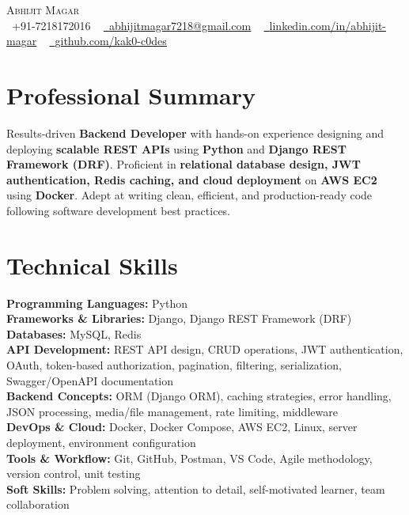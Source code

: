 \documentclass[letterpaper,11pt]{article}
\begin{document}
\begin{center}
    {\Huge \scshape Abhijit Magar} \\ \vspace{4pt}
    \small \faPhone\ +91-7218172016 ~
    \href{mailto:abhijitmagar7218@gmail.com}{\faEnvelope\ \underline{abhijitmagar7218@gmail.com}} ~
    \href{https://www.linkedin.com/in/abhijit-magar}{\faLinkedin\ \underline{linkedin.com/in/abhijit-magar}} ~
    \href{https://github.com/kak0-c0des}{\faGithub\ \underline{github.com/kak0-c0des}}
\end{center}

\section{Professional Summary}
Results-driven \textbf{Backend Developer} with hands-on experience designing and deploying \textbf{scalable REST APIs} using \textbf{Python} and \textbf{Django REST Framework (DRF)}. Proficient in \textbf{relational database design, JWT authentication, Redis caching, and cloud deployment} on \textbf{AWS EC2} using \textbf{Docker}. Adept at writing clean, efficient, and production-ready code following software development best practices.

\section{Technical Skills}
\vspace{2pt}
\textbf{Programming Languages:} Python \\[3pt]
\textbf{Frameworks \& Libraries:} Django, Django REST Framework (DRF) \\[3pt]
\textbf{Databases:} MySQL, Redis \\[3pt]
\textbf{API Development:} REST API design, CRUD operations, JWT authentication, OAuth, token-based authorization, pagination, filtering, serialization, Swagger/OpenAPI documentation \\[3pt]
\textbf{Backend Concepts:} ORM (Django ORM), caching strategies, error handling, JSON processing, media/file management, rate limiting, middleware \\[3pt]
\textbf{DevOps \& Cloud:} Docker, Docker Compose, AWS EC2, Linux, server deployment, environment configuration \\[3pt]
\textbf{Tools \& Workflow:} Git, GitHub, Postman, VS Code, Agile methodology, version control, unit testing \\[3pt]
\textbf{Soft Skills:} Problem solving, attention to detail, self-motivated learner, team collaboration
\end{document}
